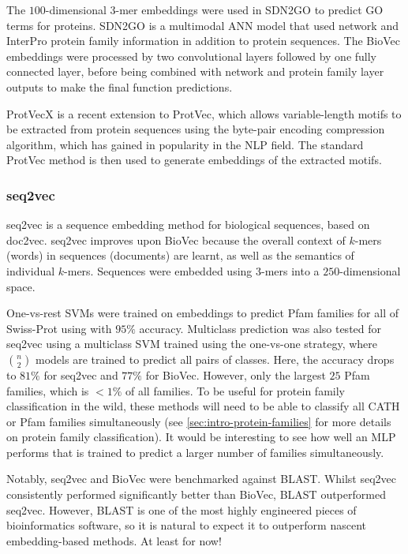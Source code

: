 The $100$-dimensional $3$-mer embeddings were used in SDN2GO \cite{Cai2020} to predict GO terms for proteins. SDN2GO is a multimodal ANN model that used network and InterPro protein family information in addition to protein sequences. The BioVec embeddings were processed by two convolutional layers followed by one fully connected layer, before being combined with network and protein family layer outputs to make the final function predictions.

ProtVecX \cite{Asgari2019} is a recent extension to ProtVec, which allows variable-length motifs to be extracted from protein sequences using the byte-pair encoding compression algorithm, which has gained in popularity in the NLP field. The standard ProtVec method is then used to generate embeddings of the extracted motifs.

\subsubsection{seq2vec}

seq2vec \cite{Kimothi2016} is a sequence embedding method for biological sequences, based on doc2vec. seq2vec improves upon BioVec because the overall context of $k$-mers (words) in sequences (documents) are learnt, as well as the semantics of individual $k$-mers. Sequences were embedded using $3$-mers into a $250$-dimensional space.

One-vs-rest SVMs were trained on embeddings to predict Pfam families for all of Swiss-Prot using with $95\%$ accuracy. Multiclass prediction was also tested for seq2vec using a multiclass SVM trained using the one-vs-one strategy, where $n\choose 2$ models are trained to predict all pairs of classes. Here, the accuracy drops to $81\%$ for seq2vec and $77\%$ for BioVec. However, only the largest $25$ Pfam families, which is $< 1\%$ of all families. To be useful for protein family classification in the wild, these methods will need to be able to classify all CATH or Pfam families simultaneously (see \ref{sec:intro-protein-families} for more details on protein family classification). It would be interesting to see how well an MLP performs that is trained to predict a larger number of families simultaneously.

Notably, seq2vec and BioVec were benchmarked against BLAST. Whilst seq2vec consistently performed significantly better than BioVec, BLAST outperformed seq2vec. However, BLAST is one of the most highly engineered pieces of bioinformatics software, so it is natural to expect it to outperform nascent embedding-based methods. At least for now!

